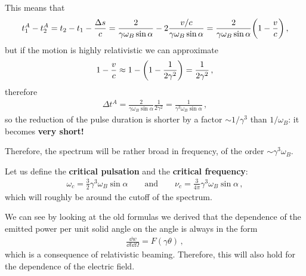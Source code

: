 \documentclass[main.tex]{subfiles}
\begin{document}
This means that 
%
\begin{align}
t_1^A- t_2^{A} = t_2 - t_1 - \frac{\Delta s}{c}  
= \frac{2}{\gamma \omega_B \sin \alpha } - 2 \frac{v/c}{\gamma \omega _B \sin \alpha }
= \frac{2}{\gamma \omega_B \sin \alpha } \qty(1 - \frac{v}{c})
\,,
\end{align}
%
but if the motion is highly relativistic we can approximate 
%
\begin{align}
1 - \frac{v}{c} \approx 1 - \qty(1 - \frac{1}{2 \gamma^2}) = \frac{1}{2 \gamma^2}
\,,
\end{align}
%
therefore 
%
\begin{align}
\Delta t^{A} = \frac{2}{\gamma \omega _B \sin \alpha } \frac{1}{2 \gamma^2} = \frac{1}{\gamma^3 \omega _B \sin \alpha }
\,,
\end{align}
%
so the reduction of the pulse duration is shorter by a factor \(\sim 1/ \gamma^3\) than \(1 / \omega _B\): it becomes \textbf{very short!}

Therefore, the spectrum will be rather broad in frequency, of the order \(\sim \gamma^3 \omega _B\). 

Let us define the \textbf{critical pulsation} and the \textbf{critical frequency}:
%
\begin{align}
\omega _c = \frac{3}{2} \gamma^3 \omega _B \sin \alpha 
\qquad \text{and} \qquad
\nu _c = \frac{3}{4 \pi } \gamma^3 \omega _B \sin \alpha 
\,,
\end{align}
%
which will roughly be around the cutoff of the spectrum. 

We can see by looking at the old formulas we derived that the dependence of the emitted power per unit solid angle on the angle is always in the form 
%
\begin{align}
\frac{ \dd{w}}{ \dd{t} \dd{\Omega }} = F(\gamma \theta )
\,,
\end{align}
%
which is a consequence of relativistic beaming. Therefore, this will also  hold for the dependence of the electric field.
\end{document}
